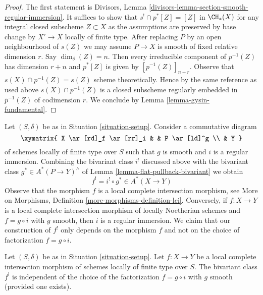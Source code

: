 \begin{proof}
The first statement is Divisors, Lemma
\ref{divisors-lemma-section-smooth-regular-immersion}.
It suffices to show that $s^! \cap p^*[Z] = [Z]$ in
$\CH_*(X)$ for any integral closed subscheme $Z \subset X$
as the assumptions are preserved by base change by $X' \to X$
locally of finite type. After replacing $P$ by an open neighbourhood
of $s(Z)$ we may assume $P \to X$ is smooth of fixed relative dimension $r$.
Say $\dim_\delta(Z) = n$. Then every irreducible component of $p^{-1}(Z)$
has dimension $r + n$ and $p^*[Z]$ is given by $[p^{-1}(Z)]_{n + r}$.
Observe that $s(X) \cap p^{-1}(Z) = s(Z)$ scheme theoretically. Hence by the
same reference as used above $s(X) \cap p^{-1}(Z)$ is a closed subscheme
regularly embedded in $\overline{p}^{-1}(Z)$ of codimension $r$.
We conclude by Lemma \ref{lemma-gysin-fundamental}.
\end{proof}

\noindent
Let $(S, \delta)$ be as in Situation \ref{situation-setup}. Consider a
commutative diagram
$$
\xymatrix{
X \ar[rd]_f \ar[rr]_i & & P \ar[ld]^g \\
& Y
}
$$
of schemes locally of finite type over $S$ such that $g$ is smooth
and $i$ is a regular immersion. Combining the bivariant class
$i^!$ discussed above with the bivariant class $g^* \in A^*(P \to Y)^\wedge$
of Lemma \ref{lemma-flat-pullback-bivariant} we obtain
$$
f^! = i^! \circ g^* \in A^*(X \to Y)
$$
Observe that the morphism $f$ is a local complete intersection morphism, see
More on Morphisms, Definition \ref{more-morphisms-definition-lci}.
Conversely, if $f : X \to Y$ is a local complete intersection morphism
of locally Noetherian schemes and $f = g \circ i$ with $g$ smooth, then
$i$ is a regular immersion. We claim that our construction of $f^!$
only depends on the morphism $f$ and not on the choice of factorization
$f = g \circ i$.

\begin{lemma}
\label{lemma-lci-gysin-well-defined}
Let $(S, \delta)$ be as in Situation \ref{situation-setup}.
Let $f : X \to Y$ be a local complete intersection morphism
of schemes locally of finite type over $S$.
The bivariant class $f^!$ is independent of the choice of
the factorization $f = g \circ i$ with $g$ smooth (provided
one exists).
\end{lemma}


